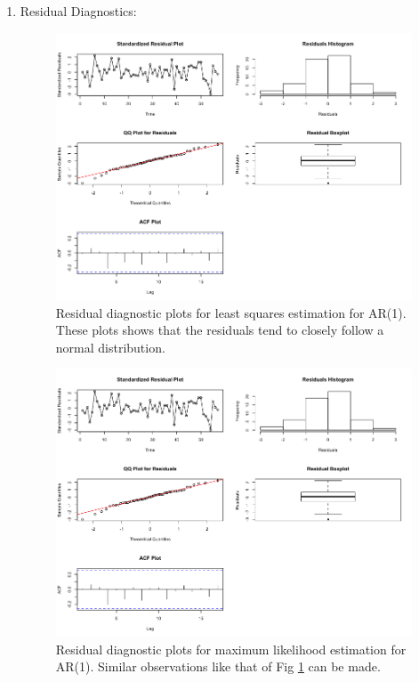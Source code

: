 \begin{enumerate}[label=(\alph*)]
\item Residual Diagnostics:
\begin{figure}[!htb]
    \centering
    \includegraphics[width=\linewidth]{Images/P2/Residual_CSS_AR1.png}
    \caption[Residual diagnostic plots for least squares estimation for AR(1).]{Residual diagnostic plots for least squares estimation for AR(1). These plots shows that the residuals tend to closely follow a normal distribution.}
    \label{fig:residual_css_ar1}
\end{figure}
\begin{figure}[!htb]
    \centering
    \includegraphics[width=\linewidth]{Images/P2/Residual_ML_AR1.png}
    \caption[Residual diagnostic plots for maximum likelihood estimation for AR(1)]{Residual diagnostic plots for maximum likelihood estimation for AR(1). Similar observations like that of Fig \ref{fig:residual_css_ar1} can be made.}

\end{figure}
\end{enumerate}
